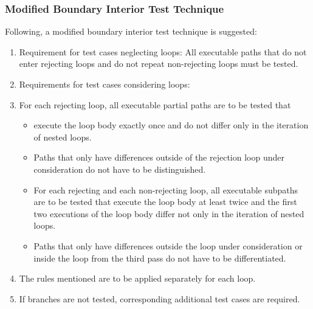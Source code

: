 

	\subsubsection{Modified Boundary Interior Test Technique}

	Following, a modified boundary interior test technique is suggested:

	\begin{enumerate}
		\item Requirement for test cases neglecting loops: All executable paths that do not enter rejecting loops and do not repeat non-rejecting loops must be tested.
		\item Requirements for test cases considering loops:
		\item For each rejecting loop, all executable partial paths are to be tested that
			\begin{itemize}
				\item execute the loop body exactly once and do not differ only in the iteration of nested loops.
				\item Paths that only have differences outside of the rejection loop under consideration do not have to be distinguished.
			\end{itemize}
			\begin{itemize}
				\item For each rejecting and each non-rejecting loop, all executable subpaths are to be tested that execute the loop body at least twice and the first two executions of the loop body differ not only in the iteration of nested loops.
				\item Paths that only have differences outside the loop under consideration or inside the loop from the third pass do not have to be differentiated.
			\end{itemize}
		\item The rules mentioned are to be applied separately for each loop.
		\item If branches are not tested, corresponding additional test cases are required.
	\end{enumerate}

